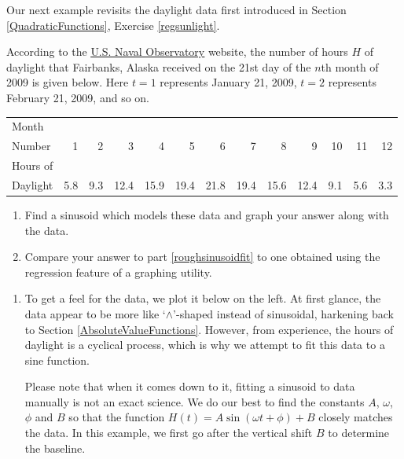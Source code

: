 \documentclass{ximera}
\begin{document}
Our next example revisits the daylight data first introduced in Section \ref{QuadraticFunctions}, Exercise \ref{regsunlight}.

\begin{example} \label{sinusoidsunlight} According to the \href{http://aa.usno.navy.mil/data/docs/RS_OneYear.php}{\underline{U.S. Naval Observatory}} website, the number of hours $H$ of daylight that Fairbanks, Alaska received on the 21st day of the $n$th month of 2009 is given below.  Here  $t = 1$ represents January 21, 2009, $t = 2$ represents February 21, 2009, and so on.  


\noindent \begin{tabular}{|l|r|r|r|r|r|r|r|r|r|r|r|r|} \hline
Month  & & & & & & & & & & & & \\
Number & 1 & 2 & 3 & 4 & 5 & 6 & 7 & 8 & 9 & 10 & 11 & 12\\ 
\hline 
Hours of  & & & & & & & & & & & & \\
Daylight & 5.8 & 9.3 & 12.4 & 15.9 & 19.4 & 21.8 & 19.4 & 15.6 & 12.4 & 9.1 & 5.6 & 3.3 \\ \hline
\end{tabular}



\begin{enumerate}

\item  \label{roughsinusoidfit} Find a sinusoid which models these data and  graph your answer along with the data. 

\item   Compare your answer to part \ref{roughsinusoidfit} to one obtained using the regression feature of a graphing utility.

\end{enumerate}

\begin{explanation}

\begin{enumerate}

\item  To get a feel for the data, we plot it below on the left. At first glance, the data appear to be more like  `$\wedge$'-shaped instead of sinusoidal, harkening back to Section \ref{AbsoluteValueFunctions}.  However, from experience, the hours of daylight is a cyclical process, which is why we attempt to fit this data to a sine function.



Please note that  when it comes down to it, fitting a sinusoid to data manually is not an exact science.  We do our best to find the constants $A$, $\omega$, $\phi$ and $B$ so that the function $H(t) = A\sin(\omega t + \phi) + B$ closely matches the data.  In this example, we  first go after the vertical shift $B$ to determine  the baseline. 




\end{enumerate}
\end{explanation}
\end{example}
\end{document}

